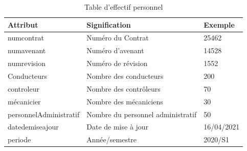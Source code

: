 \documentclass[a4paper]{report}
\begin{document}
\begin{doublespace}
	\begin{table}[H]
		\begin{center}
			\begin{tabularx}{17.5cm}{|p{4cm}|X|p{2cm}|}
				\hline
				\textbf{Attribut}      & \textbf{Signification}            & \textbf{Exemple} \\
				\hline
				numcontrat             & Numéro du Contrat                 & 25462            \\
				\hline
				numavenant             & Numéro d'avenant                  & 14528            \\
				\hline
				numrevision            & Numéro de révision                & 1552             \\
				\hline
				Conducteurs            & Nombre des conducteurs            & 200              \\
				\hline
				controleur             & Nombre des contrôleurs            & 70               \\
				\hline
				mécanicier             & Nombre des mécaniciens            & 30               \\
				\hline
				personnelAdministratif & Nombre du personnel administratif & 50               \\
				\hline
				datedemiseajour        & Date de mise à jour               & 16/04/2021       \\
				\hline
				periode                & Année/semestre                    & 2020/S1          \\
				\hline
			\end{tabularx}
			\caption{Table d'effectif personnel}
		\end{center}
	\end{table}


\end{doublespace}
\end{document}
